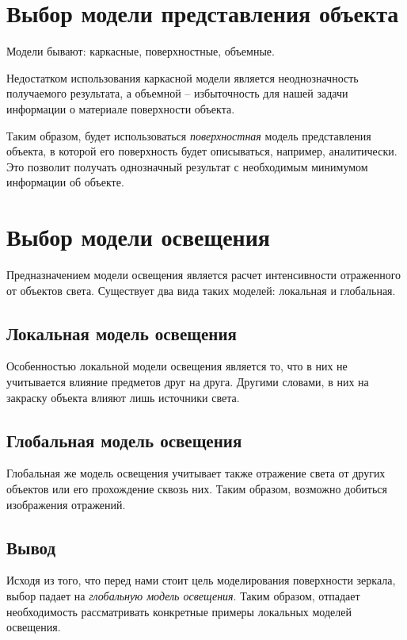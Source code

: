 \section{Выбор модели представления объекта}

Модели бывают: каркасные, поверхностные, объемные. \cite{lisyak}

Недостатком использования каркасной модели является неоднозначность получаемого результата, а объемной -- избыточность для нашей задачи информации о материале поверхности объекта.

Таким образом, будет использоваться \emph{поверхностная} модель представления объекта, в которой его поверхность будет описываться, например, аналитически.
Это позволит получать однозначный результат с необходимым минимумом информации об объекте.

\section{Выбор модели освещения}

Предназначением модели освещения является расчет интенсивности отраженного от объектов света.
Существует два вида таких моделей: локальная и глобальная. \cite{zadorozhniy, globalillum}

\subsection{Локальная модель освещения}

Особенностью локальной модели освещения является то, что в них не учитывается влияние предметов друг на друга.
Другими словами, в них на закраску объекта влияют лишь источники света.

\subsection{Глобальная модель освещения}

Глобальная же модель освещения учитывает также отражение света от других объектов или его прохождение сквозь них.
Таким образом, возможно добиться изображения отражений.

\subsection{Вывод}

Исходя из того, что перед нами стоит цель моделирования поверхности зеркала, выбор падает на \emph{глобальную модель освещения}.
Таким образом, отпадает необходимость рассматривать конкретные примеры локальных моделей освещения.

